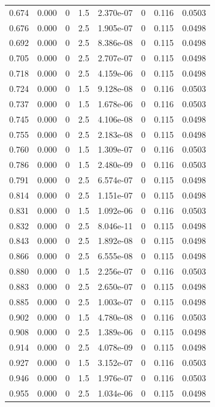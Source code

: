 \documentclass[preview]{standalone}
\begin{document}
{{{\begin{tabular}{L{1.2cm}C{1.2cm} C{0.3cm}C{0.5cm} C{1.4cm}C{1.4cm} C{1.4cm}C{1.4cm}}
  0.674  &  0.000  & 0     & 1.5 &  2.370e-07  & 0  & 0.116 &  0.0503   \\ 
  0.676  &  0.000  & 0     & 2.5 &  1.905e-07  & 0  & 0.115 &  0.0498   \\ 
  0.692  &  0.000  & 0     & 2.5 &  8.386e-08  & 0  & 0.115 &  0.0498   \\ 
  0.705  &  0.000  & 0     & 2.5 &  2.707e-07  & 0  & 0.115 &  0.0498   \\ 
  0.718  &  0.000  & 0     & 2.5 &  4.159e-06  & 0  & 0.115 &  0.0498   \\ 
  0.724  &  0.000  & 0     & 1.5 &  9.128e-08  & 0  & 0.116 &  0.0503   \\ 
  0.737  &  0.000  & 0     & 1.5 &  1.678e-06  & 0  & 0.116 &  0.0503   \\ 
  0.745  &  0.000  & 0     & 2.5 &  4.106e-08  & 0  & 0.115 &  0.0498   \\ 
  0.755  &  0.000  & 0     & 2.5 &  2.183e-08  & 0  & 0.115 &  0.0498   \\ 
  0.760  &  0.000  & 0     & 1.5 &  1.309e-07  & 0  & 0.116 &  0.0503   \\ 
  0.786  &  0.000  & 0     & 1.5 &  2.480e-09  & 0  & 0.116 &  0.0503   \\ 
  0.791  &  0.000  & 0     & 2.5 &  6.574e-07  & 0  & 0.115 &  0.0498   \\ 
  0.814  &  0.000  & 0     & 2.5 &  1.151e-07  & 0  & 0.115 &  0.0498   \\ 
  0.831  &  0.000  & 0     & 1.5 &  1.092e-06  & 0  & 0.116 &  0.0503   \\ 
  0.832  &  0.000  & 0     & 2.5 &  8.046e-11  & 0  & 0.115 &  0.0498   \\ 
  0.843  &  0.000  & 0     & 2.5 &  1.892e-08  & 0  & 0.115 &  0.0498   \\ 
  0.866  &  0.000  & 0     & 2.5 &  6.555e-08  & 0  & 0.115 &  0.0498   \\ 
  0.880  &  0.000  & 0     & 1.5 &  2.256e-07  & 0  & 0.116 &  0.0503   \\ 
  0.883  &  0.000  & 0     & 2.5 &  2.650e-07  & 0  & 0.115 &  0.0498   \\ 
  0.885  &  0.000  & 0     & 2.5 &  1.003e-07  & 0  & 0.115 &  0.0498   \\ 
  0.902  &  0.000  & 0     & 1.5 &  4.780e-08  & 0  & 0.116 &  0.0503   \\ 
  0.908  &  0.000  & 0     & 2.5 &  1.389e-06  & 0  & 0.115 &  0.0498   \\ 
  0.914  &  0.000  & 0     & 2.5 &  4.078e-09  & 0  & 0.115 &  0.0498   \\ 
  0.927  &  0.000  & 0     & 1.5 &  3.152e-07  & 0  & 0.116 &  0.0503   \\ 
  0.946  &  0.000  & 0     & 1.5 &  1.976e-07  & 0  & 0.116 &  0.0503   \\ 
  0.955  &  0.000  & 0     & 2.5 &  1.034e-06  & 0  & 0.115 &  0.0498   \\ 
\hline 
\end{tabular} 

}}}
\end{document}
